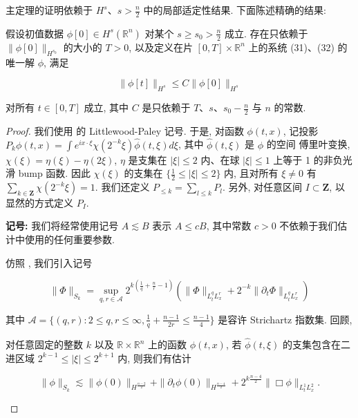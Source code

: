 主定理的证明依赖于 $H^{s}$、$s > \frac{n}{2}$ 中的局部适定性结果. 下面陈述精确的结果:

\begin{theorem}\label{thm:cG-2.18}
假设初值数据 $\phi[0] \in H^{s}(\mathbb{R}^{n})$ 对某个 $s \geq s_{0} > \frac{n}{2}$ 成立. 存在只依赖于 $\| \phi[0] \|_{H^{s_{0}}}$ 的大小的 $T > 0$, 以及定义在片 $[0,  T] \times \mathbb{R}^{n}$ 上的系统 (31)、(32) 的唯一解 $\phi$, 满足

\[
\| \phi [ t ] \| _ {H ^ {s}} \leq C \| \phi [ 0 ] \| _ {H ^ {s}}
\]

对所有 $t \in [0,  T]$ 成立, 其中 $C$ 是只依赖于 $T$、$s$、$s_{0} - \frac{n}{2}$ 与 $n$ 的常数. 
\end{theorem}

\begin{proof}
我们使用 \cite{gfref70} 的 Littlewood-Paley 记号. 于是, 对函数 $\phi(t, x)$, 记投影 $P_{k}\phi(t, x)=\int e^{ix\cdot\xi}\chi(2^{-k}\xi)\widehat{\phi}(t, \xi)d\xi$, 其中 $\widehat{\phi}(t, \xi)$ 是 $\phi$ 的空间 傅里叶变换, $\chi(\xi)=\eta(\xi)-\eta(2\xi)$, $\eta$ 是支集在 $|\xi|\leq 2$ 内、在球 $|\xi|\leq 1$ 上等于 1 的非负光滑 bump 函数. 因此 $\chi(\xi)$ 的支集在 $\{\frac{1}{2}\leq |\xi|\leq 2\}$ 内, 且对所有 $\xi\neq 0$ 有 $\sum_{k\in\mathbf{Z}}\chi(2^{-k}\xi)=1$. 我们还定义 $P_{\leq k}=\sum_{l\leq k}P_{l}$. 另外, 对任意区间 $I\subset\mathbf{Z}$, 以显然的方式定义 $P_{I}$. 

\textbf{记号:} 我们将经常使用记号 $A \lesssim B$ 表示 $A \leq cB$, 其中常数 $c > 0$ 不依赖于我们估计中使用的任何重要参数. 

仿照 \cite{gfref70}, 我们引入记号

\begin{equation}
\| \Phi \| _ {S _ {k}} = \sup _ {q,  r \in \mathcal {A}} 2 ^ {k (\frac {1}{q} + \frac {n}{r} - 1)} \left(\| \Phi \| _ {L _ {t} ^ {q} L _ {x} ^ {r}} + 2 ^ {- k} \| \partial_ {t} \Phi \| _ {L _ {t} ^ {q} L _ {x} ^ {r}} \right)\label{eq:cG-37}
\end{equation}

其中 $\mathcal{A}=\{(q, r) : 2\leq q, r\leq\infty, \frac{1}{q}+\frac{n-1}{2r}\leq\frac{n-1}{4}\}$ 是容许 Strichartz 指数集. 回顾, 

\begin{proposition}\label{prop:cG-2.19}
对任意固定的整数 $k$ 以及 $\mathbb{R}\times\mathbb{R}^{n}$ 上的函数 $\phi(t, x)$, 若 $\hat{\phi}(t, \xi)$ 的支集包含在二进区域 $2^{k-1}\leq|\xi|\leq2^{k+1}$ 内, 则我们有估计

\[
\| \phi \| _ {S _ {k}} \lesssim \| \phi (0) \| _ {H ^ {\frac {n - 2}{2}}} + \| \partial_ {t} \phi (0) \| _ {H ^ {\frac {n - 4}{2}}} + 2 ^ {k \frac {n - 4}{2}} \| \Box \phi \| _ {L _ {t} ^ {1} L _ {x} ^ {2}}.
\]
\end{proposition}
\end{proof}

